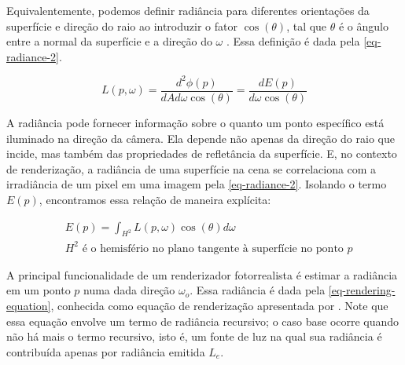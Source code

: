 \documentclass[english, 
               brazil, 
               bsc] %
               {dcomp-abntex2}
\begin{document}

Equivalentemente, podemos definir radiância para diferentes orientações da superfície e direção do raio ao introduzir o fator $\cos(\theta)$, tal que $\theta$ é o ângulo entre a normal da superfície e a direção do ${\omega}$ \cite[5.4.1]{pbr}. Essa definição é dada pela \autoref{eq-radiance-2}. 

\begin{equation} \label{eq-radiance-2}
  L(p,{\omega}) = \frac{d^2\phi(p)}{dAd{\omega} \cos(\theta)} = \frac{dE(p)}{d{\omega} \cos(\theta)} 
\end{equation}


A radiância pode fornecer informação sobre o quanto um ponto específico está iluminado na direção da câmera. Ela depende não apenas da direção do raio que incide, mas também das propriedades de refletância da superfície. E, no contexto de renderização, a radiância de uma superfície na cena se correlaciona com a irradiância de um pixel em uma imagem pela \autoref{eq-radiance-2}. Isolando o termo $E(p)$, encontramos essa relação de maneira explícita:

\begin{align*}
 \label{ep-Ep}
  &E(p) = \int_{H^2}{L(p,{\omega})\cos(\theta)d{\omega}}\\
  &H^2 \text{ é o hemisfério no plano tangente à superfície no ponto $p$}
\end{align*}


A principal funcionalidade de um renderizador fotorrealista é estimar a radiância em um ponto $p$ numa dada direção ${\omega}_o$. Essa radiância é dada pela \autoref{eq-rendering-equation}, conhecida como equação de renderização apresentada por \cite{rendering_equation}. Note que essa equação envolve um termo de radiância recursivo; o caso base ocorre quando não há mais o termo recursivo, isto é, um fonte de luz na qual sua radiância é contribuída apenas por radiância emitida $L_e$.
\end{document}
